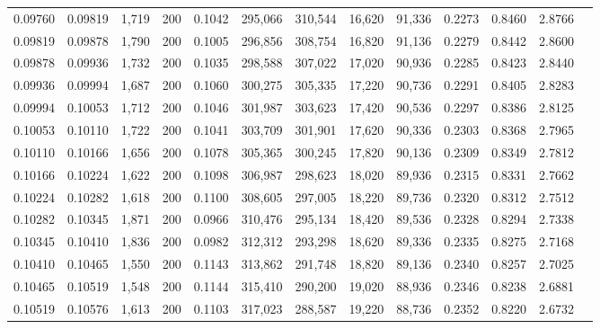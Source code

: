 \begin{tabular}{rrrrrrrrrrrrr}
0.09760 & 0.09819 &  1,719 & 200 &                                     0.1042 & 295,066 & 310,544 &  16,620 &  91,336 & 0.2273 & 0.8460 & 2.8766 \\
0.09819 & 0.09878 &  1,790 & 200 &                                     0.1005 & 296,856 & 308,754 &  16,820 &  91,136 & 0.2279 & 0.8442 & 2.8600 \\
0.09878 & 0.09936 &  1,732 & 200 &                                     0.1035 & 298,588 & 307,022 &  17,020 &  90,936 & 0.2285 & 0.8423 & 2.8440 \\
0.09936 & 0.09994 &  1,687 & 200 &                                     0.1060 & 300,275 & 305,335 &  17,220 &  90,736 & 0.2291 & 0.8405 & 2.8283 \\
0.09994 & 0.10053 &  1,712 & 200 &                                     0.1046 & 301,987 & 303,623 &  17,420 &  90,536 & 0.2297 & 0.8386 & 2.8125 \\
0.10053 & 0.10110 &  1,722 & 200 &                                     0.1041 & 303,709 & 301,901 &  17,620 &  90,336 & 0.2303 & 0.8368 & 2.7965 \\
0.10110 & 0.10166 &  1,656 & 200 &                                     0.1078 & 305,365 & 300,245 &  17,820 &  90,136 & 0.2309 & 0.8349 & 2.7812 \\
0.10166 & 0.10224 &  1,622 & 200 &                                     0.1098 & 306,987 & 298,623 &  18,020 &  89,936 & 0.2315 & 0.8331 & 2.7662 \\
0.10224 & 0.10282 &  1,618 & 200 &                                     0.1100 & 308,605 & 297,005 &  18,220 &  89,736 & 0.2320 & 0.8312 & 2.7512 \\
0.10282 & 0.10345 &  1,871 & 200 &                                     0.0966 & 310,476 & 295,134 &  18,420 &  89,536 & 0.2328 & 0.8294 & 2.7338 \\
0.10345 & 0.10410 &  1,836 & 200 &                                     0.0982 & 312,312 & 293,298 &  18,620 &  89,336 & 0.2335 & 0.8275 & 2.7168 \\
0.10410 & 0.10465 &  1,550 & 200 &                                     0.1143 & 313,862 & 291,748 &  18,820 &  89,136 & 0.2340 & 0.8257 & 2.7025 \\
0.10465 & 0.10519 &  1,548 & 200 &                                     0.1144 & 315,410 & 290,200 &  19,020 &  88,936 & 0.2346 & 0.8238 & 2.6881 \\
0.10519 & 0.10576 &  1,613 & 200 &                                     0.1103 & 317,023 & 288,587 &  19,220 &  88,736 & 0.2352 & 0.8220 & 2.6732 \\

\end{tabular}
